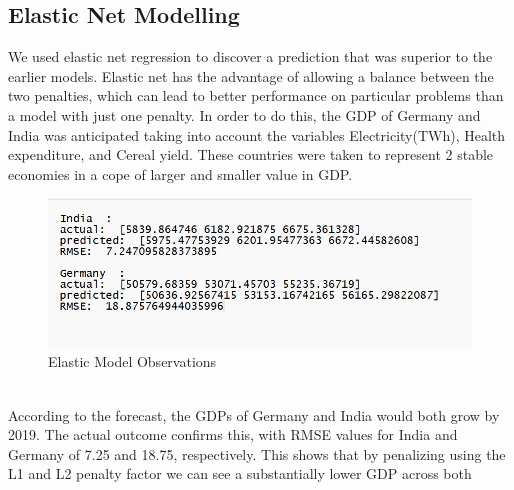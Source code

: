 \documentclass[conference]{IEEEtran}
\begin{document}
\subsection{Elastic Net Modelling}
We used elastic net regression to discover a prediction that was superior to the earlier models. Elastic net has the advantage of allowing a balance between the two penalties,
which can lead to better performance on particular problems than a model with just one penalty.
In order to do this, the GDP of Germany and India was anticipated taking into account the variables Electricity(TWh),
Health expenditure, and Cereal yield. These countries were taken to represent 2 stable economies in a cope of larger and smaller value in GDP.
\\
\begin{figure}[htbp]
    \centerline{\includegraphics[scale=0.66]{elastic1.jpg}}
    \caption{Elastic Model Observations}
\end{figure}
\\
According to the forecast, the GDPs of Germany and India would both grow by 2019. The actual outcome confirms this,
with RMSE values for India and Germany of 7.25 and 18.75, respectively.
This shows that by penalizing using the L1 and L2 penalty factor we can see a substantially lower GDP across both


\bigskip
\end{document}
